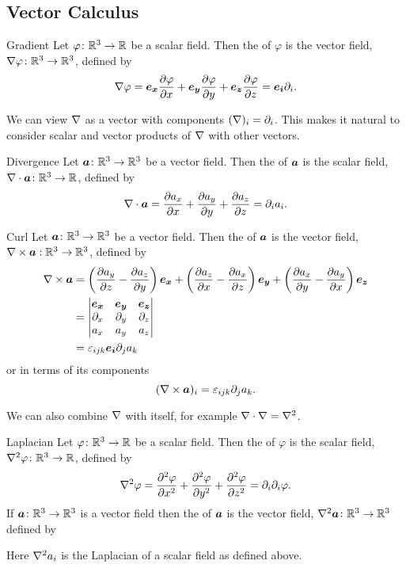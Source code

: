\subsection{Vector Calculus}
\begin{definition}{Gradient}{}
    Let \(\varphi\colon\mathbb{R}^3\to\mathbb{R}\) be a scalar field.
    Then the  of \(\varphi\) is the vector field, \(\nabla\varphi\colon\mathbb{R}^3\to\mathbb{R}^3\), defined by
    \[\nabla\varphi = \bm{e_{x}}\pdv{\varphi}{x} + \bm{e_{y}}\pdv{\varphi}{y} + \bm{e_{z}}\pdv{\varphi}{z} = \bm{e_{i}}\partial_i.\]
\end{definition}
We can view \(\nabla\) as a vector with components \((\nabla)_i = \partial_i\).
This makes it natural to consider scalar and vector products of \(\nabla\) with other vectors.
\begin{definition}{Divergence}{}
    Let \(\bm{a}\colon\mathbb{R}^3\to\mathbb{R}^3\) be a vector field.
    Then the  of \(\bm{a}\) is the scalar field, \(\nabla\cdot\bm{a}\colon\mathbb{R}^3\to\mathbb{R}\), defined by
    \[\nabla\cdot\bm{a} = \pdv{a_x}{x} + \pdv{a_y}{y} + \pdv{a_z}{z} = \partial_ia_i.\]
\end{definition}
\begin{definition}{Curl}{}
    Let \(\bm{a}\colon\mathbb{R}^3\to\mathbb{R}^3\) be a vector field.
    Then the  of \(\bm{a}\) is the vector field, \(\nabla\times\bm{a}:\mathbb{R}^3\to\mathbb{R}^3\), defined by
    \begin{align*}
        \nabla\times\bm{a} &= \left(\pdv{a_y}{z} - \pdv{a_z}{y}\right)\bm{e_{x}} + \left(\pdv{a_z}{x} - \pdv{a_x}{z}\right)\bm{e_{y}} + \left(\pdv{a_x}{y} - \pdv{a_y}{x}\right)\bm{e_{z}}\\
        &= 
        \begin{vmatrix}
            \bm{e_{x}} & \bm{e_{y}} & \bm{e_{z}}\\
            \partial_x & \partial_y & \partial_z\\
            a_x & a_y & a_z
        \end{vmatrix}
        \\
        &= \varepsilon_{ijk}\bm{e_{i}}\partial_ja_k
    \end{align*}
    or in terms of its components
    \[(\nabla\times\bm{a})_i = \varepsilon_{ijk}\partial_ja_k.\]
\end{definition}
We can also combine \(\nabla\) with itself, for example \(\nabla\cdot\nabla = \nabla^2\).
\begin{definition}{Laplacian}{}
    Let \(\varphi\colon\mathbb{R}^3\to\mathbb{R}\) be a scalar field.
    Then the  of \(\varphi\) is the scalar field, \(\nabla^2\varphi\colon\mathbb{R}^3\to\mathbb{R}\), defined by
    \[\nabla^2\varphi = \pdv[2]{\varphi}{x} + \pdv[2]{\varphi}{y} + \pdv[2]{\varphi}{z} = \partial_i\partial_i\varphi.\]
    If \(\bm{a}\colon\mathbb{R}^3\to\mathbb{R}^3\) is a vector field then the  of \(\bm{a}\) is the vector field, \(\nabla^2\bm{a}\colon\mathbb{R}^3\to\mathbb{R}^3\) defined by
    
    Here \(\nabla^2 a_i\) is the Laplacian of a scalar field as defined above.
\end{definition}
